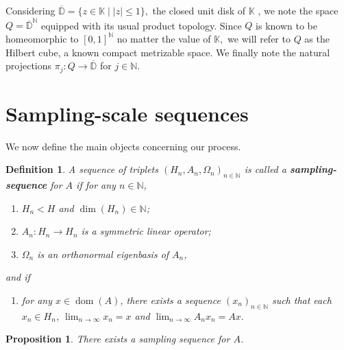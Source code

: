 \documentclass[10pt,a4paper]{amsart}
\newtheorem{prop}[thm]{Proposition}
\newtheorem{defn}[thm]{Definition}
\def \Dom{\operatorname{dom}}
\newcounter{pointnumber}
\begin{document}
Considering $\overline{\mathbb{D}}=\{z\in\mathbb{K}\;|\; |z|\leq 1\},$ the closed unit disk of $\mathbb{K}$ , we note the space $Q=\overline{\mathbb{D}}^{\mathbb{N}}$ equipped with its usual product topology. Since $Q$ is known to be homeomorphic to $[0,1]^{\mathbb{N}}$ no matter the value of $\mathbb{K},$ we will refer to $Q$ as the Hilbert cube, a known compact metrizable space. We finally note the natural projections $\pi_j:Q\rightarrow\overline{\mathbb{D}}$ for $j\in\mathbb{N}.$
\section{Sampling-scale sequences}\label{section_sampling}

We now define the main objects concerning our process.
\begin{defn}\label{definition_sampling}
	A sequence of triplets $(H_n,A_n,\Omega_n)_{n\in\mathbb{N}}$ is called a \textbf{sampling-sequence} for $A$ if for any $n\in\mathbb{N}$,
	\begin{enumerate}
		\item\label{property_sampling_finite_dim} $H_n< H$ and $\operatorname{dim}(H_n)\in\mathbb{N}$;
		\item\label{property_sampling_symmetric_op} $A_n: H_n\rightarrow H_n$ is a symmetric linear operator;
		\item\label{property_sampling_eigenbasis} $\Omega_n$ is an orthonormal eigenbasis of $A_n$,
		\setcounter{pointnumber}{\value{enumi}}
	\end{enumerate}
	and if
	\begin{enumerate}
		\setcounter{enumi}{\value{pointnumber}}
		\item\label{property_sampling_approx} for any $x\in\Dom(A)$, there exists a sequence $(x_n)_{n\in\mathbb{N}}$ such that each $x_n\in H_n$, $\lim_{n\rightarrow\infty}x_n=x$ and $\lim_{n\rightarrow\infty} A_n x_n=Ax.$
		\setcounter{pointnumber}{\value{enumi}}
	\end{enumerate}
\end{defn}
\begin{prop}\label{proposition_sampling_existence}
	There exists a sampling sequence for $A$.
\end{prop}
\end{document}
